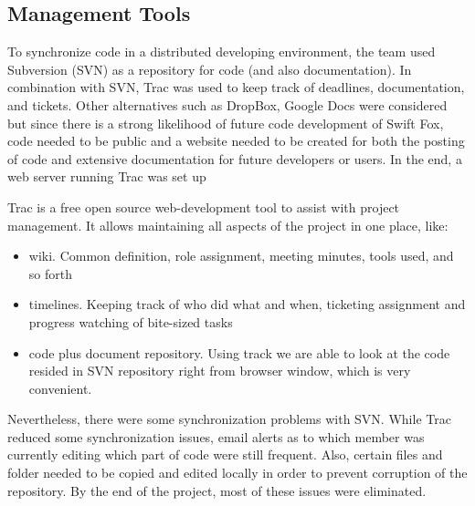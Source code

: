 \subsection{Management Tools}

To synchronize code in a distributed developing environment, the team used 
Subversion (SVN) as a repository for code (and also documentation). In
combination with SVN, Trac was used to keep track of deadlines,
documentation, and tickets. Other alternatives such as DropBox, Google Docs
were considered but since there is a strong likelihood of future code
development of Swift Fox, code needed to be public and a website needed to 
be created for both the posting of code and extensive documentation for
future developers or users. In the end, a web server running Trac was set
up 

Trac is a free open source web-development tool to assist with project
management. It allows maintaining all aspects of the project in one place, 
like:
\begin{itemize}
	\item wiki. Common definition, role assignment, meeting minutes,
	tools used, and so forth
	\item timelines. Keeping track of who did what and when, ticketing
	assignment and progress watching of bite-sized tasks
	\item code plus document repository. Using track we are able to
	look at the code resided in SVN repository right from browser
	window, which is very convenient. 
\end{itemize}

Nevertheless, there were some synchronization problems with SVN. While Trac
reduced some synchronization issues, email alerts as to which member was
currently editing which part of code were still frequent. Also, certain
files and folder needed to be copied and edited locally in order to prevent
corruption of the repository. By the end of the project, most of these
issues were eliminated.
